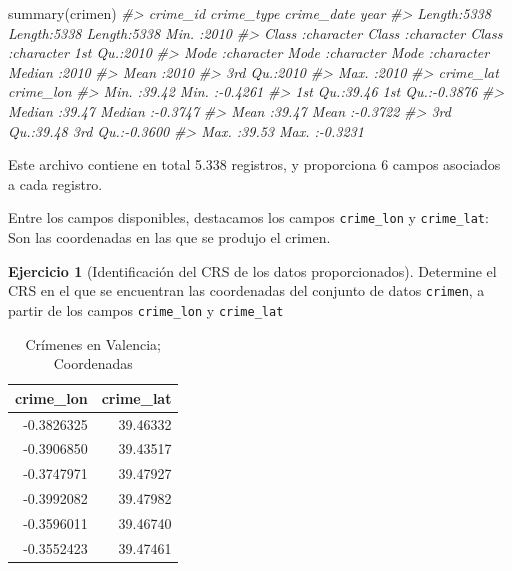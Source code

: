 \documentclass[
]{book}
\newenvironment{Shaded}{\begin{snugshade}}{\end{snugshade}}
\newcommand{\CommentTok}[1]{\textcolor[rgb]{0.56,0.35,0.01}{\textit{#1}}}
\newcommand{\FunctionTok}[1]{\textcolor[rgb]{0.00,0.00,0.00}{#1}}
\newcommand{\NormalTok}[1]{#1}
\theoremstyle{definition}
\theoremstyle{definition}
\theoremstyle{definition}
\newtheorem{exercise}{Ejercicio}[chapter]
\theoremstyle{definition}
\theoremstyle{remark}
\begin{document}
\begin{Shaded}
\begin{Highlighting}[]
\FunctionTok{summary}\NormalTok{(crimen)}
\CommentTok{\#\textgreater{}    crime\_id          crime\_type         crime\_date             year     }
\CommentTok{\#\textgreater{}  Length:5338        Length:5338        Length:5338        Min.   :2010  }
\CommentTok{\#\textgreater{}  Class :character   Class :character   Class :character   1st Qu.:2010  }
\CommentTok{\#\textgreater{}  Mode  :character   Mode  :character   Mode  :character   Median :2010  }
\CommentTok{\#\textgreater{}                                                           Mean   :2010  }
\CommentTok{\#\textgreater{}                                                           3rd Qu.:2010  }
\CommentTok{\#\textgreater{}                                                           Max.   :2010  }
\CommentTok{\#\textgreater{}    crime\_lat       crime\_lon      }
\CommentTok{\#\textgreater{}  Min.   :39.42   Min.   :{-}0.4261  }
\CommentTok{\#\textgreater{}  1st Qu.:39.46   1st Qu.:{-}0.3876  }
\CommentTok{\#\textgreater{}  Median :39.47   Median :{-}0.3747  }
\CommentTok{\#\textgreater{}  Mean   :39.47   Mean   :{-}0.3722  }
\CommentTok{\#\textgreater{}  3rd Qu.:39.48   3rd Qu.:{-}0.3600  }
\CommentTok{\#\textgreater{}  Max.   :39.53   Max.   :{-}0.3231}
\end{Highlighting}
\end{Shaded}

Este archivo contiene en total
5.338 registros, y
proporciona 6 campos asociados a cada registro.

Entre los campos disponibles, destacamos los campos \texttt{crime\_lon} y \texttt{crime\_lat}:
Son las coordenadas en las que se produjo el crimen.

\begin{exercise}[Identificación del CRS de los datos proporcionados]
\protect\hypertarget{exr:ex27}{}\label{exr:ex27}Determine el CRS en el que se encuentran las coordenadas del conjunto de datos
\texttt{crimen}, a partir de los campos \texttt{crime\_lon} y \texttt{crime\_lat}
\end{exercise}

\begin{table}

\caption{\label{tab:coods-lonlat}Crímenes en Valencia; Coordenadas}
\centering
\begin{tabular}[t]{r|r}
\hline
crime\_lon & crime\_lat\\
\hline
-0.3826325 & 39.46332\\
\hline
-0.3906850 & 39.43517\\
\hline
-0.3747971 & 39.47927\\
\hline
-0.3992082 & 39.47982\\
\hline
-0.3596011 & 39.46740\\
\hline
-0.3552423 & 39.47461\\
\hline
\end{tabular}
\end{table}
\end{document}
